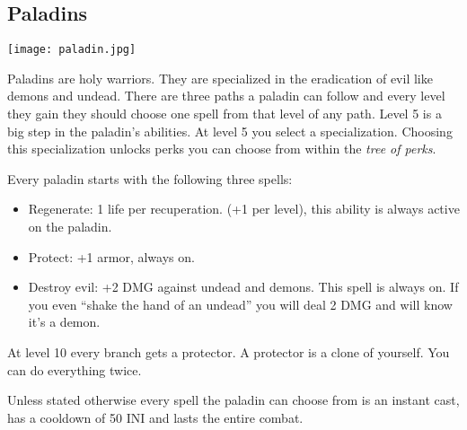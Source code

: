 
\pagebreak
\subsection{Paladins}


\texttt{[image: paladin.jpg]}

Paladins are holy warriors. They are specialized in the eradication of evil like demons and undead. There are three paths a paladin can follow and every level they gain they should choose one spell from that level of any path. 
Level 5 is a big step in the paladin's abilities. At level 5 you select a specialization. Choosing this specialization unlocks perks you can choose from within the \emph{tree of perks}.

Every paladin starts with the following three spells:

\begin{itemize}
\item Regenerate: 1 life per recuperation. (+1 per level), this ability is always active on the paladin.
\item Protect: +1 armor, always on.
\item Destroy evil: +2 DMG against undead and demons. This spell is always on. If you even “shake the hand of an undead” you will deal 2 DMG and will know it’s a demon.
\end{itemize}

\bigskip

At level 10 every branch gets a protector. A protector is a clone of yourself. You can do everything twice.

Unless stated otherwise every spell the paladin can choose from is an instant cast, has a cooldown of 50 INI and lasts the entire combat.

\bigskip

